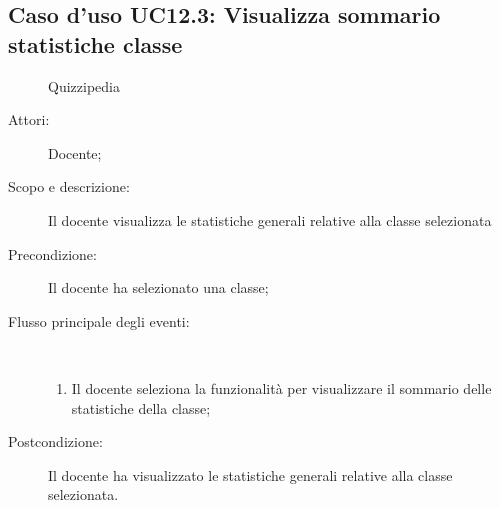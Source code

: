 \subsection{Caso d'uso UC12.3: Visualizza sommario statistiche classe}
	\begin{figure}[H]
		\centering
		\begin{resizedtikzpicture}{\textwidth}
		\begin{umlsystem}[x=0, fill=lightgray!20]{Quizzipedia}
		\end{umlsystem}
		\end{resizedtikzpicture}
		\caption{}
	\end{figure}
\begin{description}
\item[Attori:] Docente;
\item[Scopo e descrizione:] Il docente visualizza le statistiche generali relative alla classe selezionata
      \item[Precondizione:] Il docente ha selezionato una classe;

        \item[Flusso principale degli eventi:] \ 
 \begin{enumerate}
          \item Il docente seleziona la funzionalità per visualizzare il sommario delle statistiche della classe;

      \end{enumerate}
    \item[Postcondizione:] Il docente ha visualizzato le statistiche generali relative alla classe selezionata.
  \end{description}
\hypertarget{UC12.4}{}

